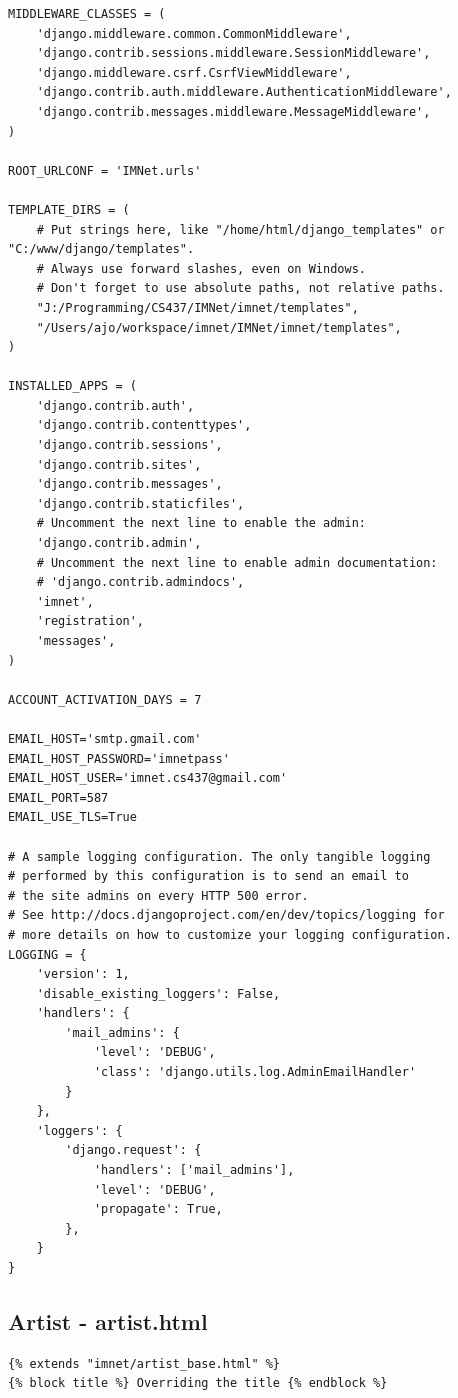 \documentclass[letterpaper,12pt]{article}
\begin{document}
{\begin{verbatim}
MIDDLEWARE_CLASSES = (
    'django.middleware.common.CommonMiddleware',
    'django.contrib.sessions.middleware.SessionMiddleware',
    'django.middleware.csrf.CsrfViewMiddleware',
    'django.contrib.auth.middleware.AuthenticationMiddleware',
    'django.contrib.messages.middleware.MessageMiddleware',
)

ROOT_URLCONF = 'IMNet.urls'

TEMPLATE_DIRS = (
    # Put strings here, like "/home/html/django_templates" or "C:/www/django/templates".
    # Always use forward slashes, even on Windows.
    # Don't forget to use absolute paths, not relative paths.
    "J:/Programming/CS437/IMNet/imnet/templates",
    "/Users/ajo/workspace/imnet/IMNet/imnet/templates",
)

INSTALLED_APPS = (
    'django.contrib.auth',
    'django.contrib.contenttypes',
    'django.contrib.sessions',
    'django.contrib.sites',
    'django.contrib.messages',
    'django.contrib.staticfiles',
    # Uncomment the next line to enable the admin:
    'django.contrib.admin',
    # Uncomment the next line to enable admin documentation:
    # 'django.contrib.admindocs',
    'imnet',
    'registration',
    'messages',
)

ACCOUNT_ACTIVATION_DAYS = 7

EMAIL_HOST='smtp.gmail.com'
EMAIL_HOST_PASSWORD='imnetpass'
EMAIL_HOST_USER='imnet.cs437@gmail.com'
EMAIL_PORT=587
EMAIL_USE_TLS=True

# A sample logging configuration. The only tangible logging
# performed by this configuration is to send an email to
# the site admins on every HTTP 500 error.
# See http://docs.djangoproject.com/en/dev/topics/logging for
# more details on how to customize your logging configuration.
LOGGING = {
    'version': 1,
    'disable_existing_loggers': False,
    'handlers': {
        'mail_admins': {
            'level': 'DEBUG',
            'class': 'django.utils.log.AdminEmailHandler'
        }
    },
    'loggers': {
        'django.request': {
            'handlers': ['mail_admins'],
            'level': 'DEBUG',
            'propagate': True,
        },
    }
}
\end{verbatim}

\textcolor{subsection}{\subsection{Artist - artist.html}}
\begin{verbatim}
{% extends "imnet/artist_base.html" %}
{% block title %} Overriding the title {% endblock %}


\end{verbatim}}
\end{document}
